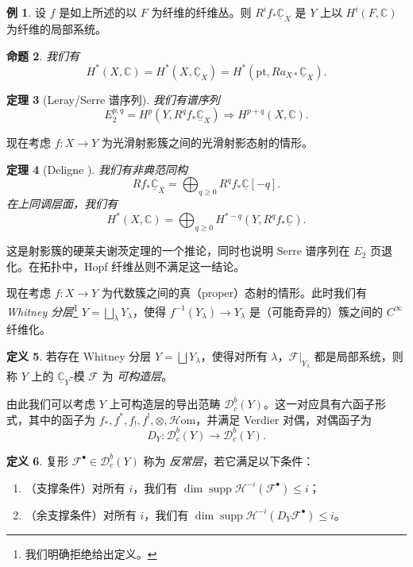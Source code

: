 \documentclass{amsart}
\newtheorem{thm}{定理}[section]
\newtheorem{prop}[thm]{命题}
\theoremstyle{definition}
\newtheorem{defn}[thm]{定义}
\newtheorem{exm}[thm]{例}
\theoremstyle{remark}
\theoremstyle{plain}
\theoremstyle{definition}
\theoremstyle{remark}
\newcommand{\C}{\mathbb{C}}
\newcommand{\mc}[1]{\mathcal{#1}}
\newcommand{\mr}[1]{\mathrm{#1}}
\newcommand{\on}[1]{\operatorname{#1}}
\newcommand{\ul}[1]{\underline{#1}}
\newcommand{\1}{\mathbf{1}}
\newcommand{\2}{\mathbf{2}}
\newcommand{\3}{\mathbf{3}}
\begin{document}
\begin{exm}
    设 \(f\) 是如上所述的以 \(F\) 为纤维的纤维丛。则 \(R^i f_* \ul{\C}_X\) 是 \(Y\) 上以 \(H^i(F, \C)\) 为纤维的局部系统。
\end{exm}

\begin{prop}
    我们有
    \[ H^*(X, \C) = H^*(X, \ul{\C}_X) = H^*(\mr{pt}, R a_{X*} \ul{\C}_X). \]
\end{prop}

\begin{thm}[Leray/Serre 谱序列]
    我们有谱序列
    \[ E_2^{p,q} = H^p(Y, R^q f_* \ul{\C}_X) \Rightarrow H^{p+q}(X, \C). \]
\end{thm}

现在考虑 \(f \colon X \to Y\) 为光滑射影簇之间的光滑射影态射的情形。

\begin{thm}[Deligne {\cite{Deligne1968}}]
    我们有非典范同构
    \[ R f_* \ul{\C}_X = \bigoplus_{q \geq 0} R^q f_* \ul{\C}[-q]. \]
    在上同调层面，我们有
    \[ H^*(X, \C) = \bigoplus_{q \geq 0} H^{*-q}(Y, R^q f_* \ul{\C}). \]
\end{thm}

这是射影簇的硬莱夫谢茨定理的一个推论，同时也说明 Serre 谱序列在 \(E_2\) 页退化。在拓扑中，Hopf 纤维丛则不满足这一结论。

现在考虑 \(f \colon X \to Y\) 为代数簇之间的真（proper）态射的情形。此时我们有 \textit{Whitney 分层}\footnote{我们明确拒绝给出定义。} \(Y = \bigsqcup_{\lambda} Y_{\lambda}\)，使得 \(f^{-1}(Y_{\lambda}) \to Y_{\lambda}\) 是（可能奇异的）簇之间的 \(C^{\infty}\) 纤维化。

\begin{defn}
    若存在 Whitney 分层 \(Y = \bigsqcup Y_{\lambda}\)，使得对所有 \(\lambda\)，\(\mc{F}|_{Y_{\lambda}}\) 都是局部系统，则称 \(Y\) 上的 \(\ul{\C}_Y\)-模 \(\mc{F}\) 为 \textit{可构造层}。
\end{defn}

由此我们可以考虑 \(Y\) 上可构造层的导出范畴 \(\mc{D}_c^b(Y)\)。这一对应具有六函子形式，其中的函子为 \(f_*, f^*, f_!, f^!, \otimes, \mc{H}\mr{om}\)，并满足 Verdier 对偶，对偶函子为
\[ D_Y \colon \mc{D}_c^b(Y) \to \mc{D}_c^b(Y). \]

\begin{defn}
    复形 \(\mc{F}^{\bullet} \in \mc{D}_c^b(Y)\) 称为 \textit{反常层}，若它满足以下条件：
    \begin{enumerate}
        \item （支撑条件）对所有 \(i\)，我们有 \(\dim \on{supp} \mc{H}^{-i}(\mc{F}^{\bullet}) \leq i\)；
        \item （余支撑条件）对所有 \(i\)，我们有 \(\dim \on{supp} \mc{H}^{-i}(D_Y \mc{F}^{\bullet}) \leq i\)。
    \end{enumerate}
\end{defn}
\end{document}

